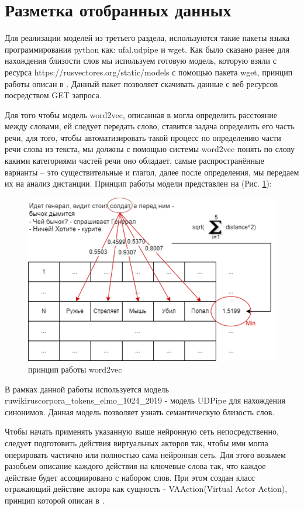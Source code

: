 \section{Разметка отобранных данных}

Для реализации моделей из третьего раздела, используются такие пакеты языка программирования python как: ufal.udpipe и wget. 
Как было сказано ранее для нахождения близости слов мы используем готовую модель, которую взяли с ресурса 
https://rusvectores.org/static/models с помощью пакета wget, принцип работы описан в \cite{neural08}. Данный пакет позволяет скачивать данные 
с веб ресурсов посредством GET запроса.

Для того чтобы модель word2vec, описанная в \cite{w2vec02} могла определить расстояние между словами, ей следует передать слово, ставится задача определить 
его часть речи, для того, чтобы автоматизировать такой процесс по определению части речи слова из текста, мы должны с помощью 
системы word2vec понять по слову какими категориями частей речи оно обладает, самые распространённые варианты – это 
существительные и глагол, далее после определения,  мы передаем их на анализ дистанции. 
Принцип работы модели представлен на (Рис. \ref{pic:ris15}):

\begin{figure}[H]
\includegraphics[width=0.75\columnwidth]{./img/ris15.png}
\centering
\caption{принцип работы word2vec}
\label{pic:ris15}
\end{figure}

В рамках данной работы используется модель ruwikiruscorpora\_tokens\_elmo\_1024\_2019 - модель UDPipe для нахождения синонимов. 
Данная модель позволяет узнать семантическую близость слов.

Чтобы начать применять указанную выше нейронную сеть непосредственно, следует подготовить действия виртуальных акторов так, 
чтобы ими могла оперировать частично или полностью сама нейронная сеть. Для этого возьмем разобьем описание каждого действия 
на ключевые слова так, что каждое действие будет ассоциировано с набором слов. При этом создан класс отражающий действие 
актора как сущность - VAAction(Virtual Actor Action), принцип которой описан в \cite{w2vec01}.

